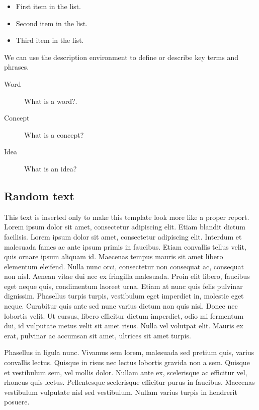 \documentclass[fleqn,moreauthors,10pt]{ds_report}
\begin{document}
\begin{itemize}[noitemsep] 
	\item First item in the list.
	\item Second item in the list.
	\item Third item in the list.
\end{itemize}

We can use the description environment to define or describe key terms and phrases.

\begin{description}
	\item[Word] What is a word?.
	\item[Concept] What is a concept?
	\item[Idea] What is an idea?
\end{description}


\subsection*{Random text}

This text is inserted only to make this template look more like a proper report. Lorem ipsum dolor sit amet, consectetur adipiscing elit. Etiam blandit dictum facilisis. Lorem ipsum dolor sit amet, consectetur adipiscing elit. Interdum et malesuada fames ac ante ipsum primis in faucibus. Etiam convallis tellus velit, quis ornare ipsum aliquam id. Maecenas tempus mauris sit amet libero elementum eleifend. Nulla nunc orci, consectetur non consequat ac, consequat non nisl. Aenean vitae dui nec ex fringilla malesuada. Proin elit libero, faucibus eget neque quis, condimentum laoreet urna. Etiam at nunc quis felis pulvinar dignissim. Phasellus turpis turpis, vestibulum eget imperdiet in, molestie eget neque. Curabitur quis ante sed nunc varius dictum non quis nisl. Donec nec lobortis velit. Ut cursus, libero efficitur dictum imperdiet, odio mi fermentum dui, id vulputate metus velit sit amet risus. Nulla vel volutpat elit. Mauris ex erat, pulvinar ac accumsan sit amet, ultrices sit amet turpis.

Phasellus in ligula nunc. Vivamus sem lorem, malesuada sed pretium quis, varius convallis lectus. Quisque in risus nec lectus lobortis gravida non a sem. Quisque et vestibulum sem, vel mollis dolor. Nullam ante ex, scelerisque ac efficitur vel, rhoncus quis lectus. Pellentesque scelerisque efficitur purus in faucibus. Maecenas vestibulum vulputate nisl sed vestibulum. Nullam varius turpis in hendrerit posuere.
\end{document}

